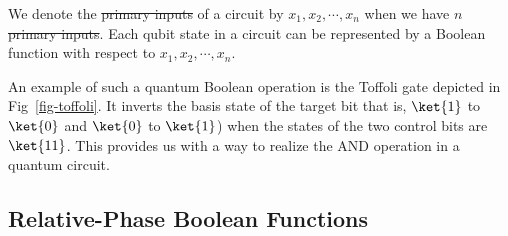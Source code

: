 \documentclass[paper]{ieice}
\providecommand{\DIFadd}[1]{{\protect\color{blue}{#1}}} %
\providecommand{\DIFdel}[1]{{\protect\color{red}\sout{#1}}}                      %
\providecommand{\DIFaddbegin}{} %
\providecommand{\DIFaddend}{} %
\providecommand{\DIFdelbegin}{} %
\providecommand{\DIFdelend}{} %
\newcommand{\DIFscaledelfig}{0.5}
\newlength{\DIFdelgraphicswidth} %
\newlength{\DIFdelgraphicsheight} %
\newcommand{\DIFaddincludegraphics}[2][]{{\color{blue}\fbox{\DIFOincludegraphics[#1]{#2}}}} %
\newcommand{\DIFdelincludegraphics}[2][]{%
\sbox{\DIFdelgraphicsbox}{\DIFOincludegraphics[#1]{#2}}%
\settoboxwidth{\DIFdelgraphicswidth}{\DIFdelgraphicsbox} %
\settoboxtotalheight{\DIFdelgraphicsheight}{\DIFdelgraphicsbox} %
\scalebox{\DIFscaledelfig}{%
\parbox[b]{\DIFdelgraphicswidth}{\usebox{\DIFdelgraphicsbox}\\[-\baselineskip] \rule{\DIFdelgraphicswidth}{0em}}\llap{\resizebox{\DIFdelgraphicswidth}{\DIFdelgraphicsheight}{%
\setlength{\unitlength}{\DIFdelgraphicswidth}%
\begin{picture}(1,1)%
\thicklines\linethickness{2pt} %
{\color[rgb]{1,0,0}\put(0,0){\framebox(1,1){}}}%
{\color[rgb]{1,0,0}\put(0,0){\line( 1,1){1}}}%
{\color[rgb]{1,0,0}\put(0,1){\line(1,-1){1}}}%
\end{picture}%
}\hspace*{3pt}}} %
} %
\DeclareRobustCommand{\DIFaddbegin}{\DIFOaddbegin \let\includegraphics\DIFaddincludegraphics} %
\DeclareRobustCommand{\DIFaddend}{\DIFOaddend \let\includegraphics\DIFOincludegraphics} %
\DeclareRobustCommand{\DIFdelbegin}{\DIFOdelbegin \let\includegraphics\DIFdelincludegraphics} %
\DeclareRobustCommand{\DIFdelend}{\DIFOaddend \let\includegraphics\DIFOincludegraphics} %
\begin{document}
We denote the \DIFdelbegin \DIFdel{primary inputs }\DIFdelend \DIFaddbegin \DIFadd{input qubits }\DIFaddend of a circuit by $x_1, x_2, \cdots,x_{n}$  when we have $n$ \DIFdelbegin \DIFdel{primary inputs}\DIFdelend \DIFaddbegin \DIFadd{input qubits}\DIFaddend . Each qubit state in a circuit can be represented by a Boolean function with respect to $x_1, x_2, \cdots,x_{n}$.

An example of such a quantum Boolean operation is the Toffoli gate depicted in
Fig\DIFaddbegin \DIFadd{. }\DIFaddend ~\ref{fig-toffoli}. It inverts the basis state of the target bit that is, $\ket{1}$ to $\ket{0}$ and $\ket{0}$ to $\ket{1}$) when the states of the two control bits are $\ket{11}$. This provides us with a way to realize the AND operation in a quantum circuit.

\subsection{Relative-Phase Boolean Functions}
\end{document}
